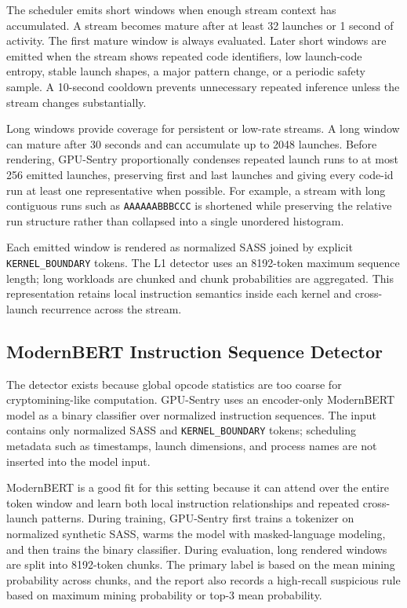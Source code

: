 The scheduler emits short windows when enough stream context has accumulated. A stream becomes mature after at least 32 launches or 1 second of activity. The first mature window is always evaluated. Later short windows are emitted when the stream shows repeated code identifiers, low launch-code entropy, stable launch shapes, a major pattern change, or a periodic safety sample. A 10-second cooldown prevents unnecessary repeated inference unless the stream changes substantially.

Long windows provide coverage for persistent or low-rate streams. A long window can mature after 30 seconds and can accumulate up to 2048 launches. Before rendering, GPU-Sentry proportionally condenses repeated launch runs to at most 256 emitted launches, preserving first and last launches and giving every code-id run at least one representative when possible. For example, a stream with long contiguous runs such as \texttt{AAAAAABBBCCC} is shortened while preserving the relative run structure rather than collapsed into a single unordered histogram.

Each emitted window is rendered as normalized SASS joined by explicit \texttt{KERNEL\_BOUNDARY} tokens. The L1 detector uses an 8192-token maximum sequence length; long workloads are chunked and chunk probabilities are aggregated. This representation retains local instruction semantics inside each kernel and cross-launch recurrence across the stream.

\subsection{ModernBERT Instruction Sequence Detector}
\label{sec:classifier}

The detector exists because global opcode statistics are too coarse for cryptomining-like computation. GPU-Sentry uses an encoder-only ModernBERT model as a binary classifier over normalized instruction sequences. The input contains only normalized SASS and \texttt{KERNEL\_BOUNDARY} tokens; scheduling metadata such as timestamps, launch dimensions, and process names are not inserted into the model input.

ModernBERT is a good fit for this setting because it can attend over the entire token window and learn both local instruction relationships and repeated cross-launch patterns. During training, GPU-Sentry first trains a tokenizer on normalized synthetic SASS, warms the model with masked-language modeling, and then trains the binary classifier. During evaluation, long rendered windows are split into 8192-token chunks. The primary label is based on the mean mining probability across chunks, and the report also records a high-recall suspicious rule based on maximum mining probability or top-3 mean probability.

